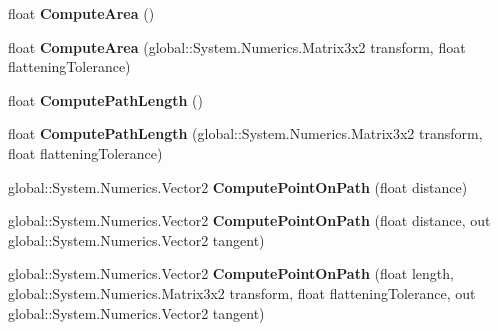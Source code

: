 \begin{DoxyCompactItemize}
\item 
\mbox{\label{class_microsoft_1_1_graphics_1_1_canvas_1_1_geometry_1_1_canvas_geometry_aa08eda160516a30cec6d6df2eff63201}} 
float {\bfseries Compute\+Area} ()
\item 
\mbox{\label{class_microsoft_1_1_graphics_1_1_canvas_1_1_geometry_1_1_canvas_geometry_a691883046354446e27838e64d21e99bb}} 
float {\bfseries Compute\+Area} (global\+::\+System.\+Numerics.\+Matrix3x2 transform, float flattening\+Tolerance)
\item 
\mbox{\label{class_microsoft_1_1_graphics_1_1_canvas_1_1_geometry_1_1_canvas_geometry_ac795f5b565a905b8bfbd67e69c327ceb}} 
float {\bfseries Compute\+Path\+Length} ()
\item 
\mbox{\label{class_microsoft_1_1_graphics_1_1_canvas_1_1_geometry_1_1_canvas_geometry_a5ddd0bb4b6fa3da6b55d5cdbfdbea574}} 
float {\bfseries Compute\+Path\+Length} (global\+::\+System.\+Numerics.\+Matrix3x2 transform, float flattening\+Tolerance)
\item 
\mbox{\label{class_microsoft_1_1_graphics_1_1_canvas_1_1_geometry_1_1_canvas_geometry_a5bc13e03dbf00e5ca5deef3ddcc406c8}} 
global\+::\+System.\+Numerics.\+Vector2 {\bfseries Compute\+Point\+On\+Path} (float distance)
\item 
\mbox{\label{class_microsoft_1_1_graphics_1_1_canvas_1_1_geometry_1_1_canvas_geometry_a59cbc03d8d69b1b5eb3ac79a8e38ec04}} 
global\+::\+System.\+Numerics.\+Vector2 {\bfseries Compute\+Point\+On\+Path} (float distance, out global\+::\+System.\+Numerics.\+Vector2 tangent)
\item 
\mbox{\label{class_microsoft_1_1_graphics_1_1_canvas_1_1_geometry_1_1_canvas_geometry_a6bc7857a0a83e9f54a5231413995be25}} 
global\+::\+System.\+Numerics.\+Vector2 {\bfseries Compute\+Point\+On\+Path} (float length, global\+::\+System.\+Numerics.\+Matrix3x2 transform, float flattening\+Tolerance, out global\+::\+System.\+Numerics.\+Vector2 tangent)

\end{DoxyCompactItemize}
